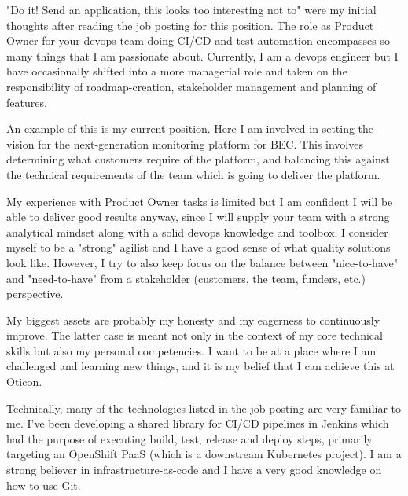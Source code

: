 \documentclass[11pt, a4paper]{awesome-cv} %
\begin{document}
\makecvheader %

\makelettertitle %


\begin{cvletter}
"Do it! Send an application, this looks too interesting not to" were my initial thoughts after reading the job posting for this position. The role as Product Owner for your devops team doing CI/CD and test automation encompasses so many things that I am passionate about. Currently, I am a devops engineer but I have occasionally shifted into a more managerial role and taken on the responsibility of roadmap-creation, stakeholder management and planning of features.

An example of this is my current position. Here I am involved in setting the vision for the next-generation monitoring platform for BEC. This involves determining what customers require of the platform, and balancing this against the technical requirements of the team which is going to deliver the platform.

My experience with Product Owner tasks is limited but I am confident I will be able to deliver good results anyway, since I will supply your team with a strong analytical mindset along with a solid devops knowledge and toolbox. I consider myself to be a "strong" agilist and I have a good sense of what quality solutions look like. However, I try to also keep focus on the balance between "nice-to-have" and "need-to-have" from a stakeholder (customers, the team, funders, etc.) perspective.

My biggest assets are probably my honesty and my eagerness to continuously improve. The latter case is meant not only in the context of my core technical skills but also my personal competencies. I want to be at a place where I am challenged and learning new things, and it is my belief that I can achieve this at Oticon.

Technically, many of the technologies listed in the job posting are very familiar to me. I've been developing a shared library for CI/CD pipelines in Jenkins which had the purpose of executing build, test, release and deploy steps, primarily targeting an OpenShift PaaS (which is a downstream Kubernetes project). I am a strong believer in infrastructure-as-code and I have a very good knowledge on how to use Git.


\end{cvletter}
\end{document}
